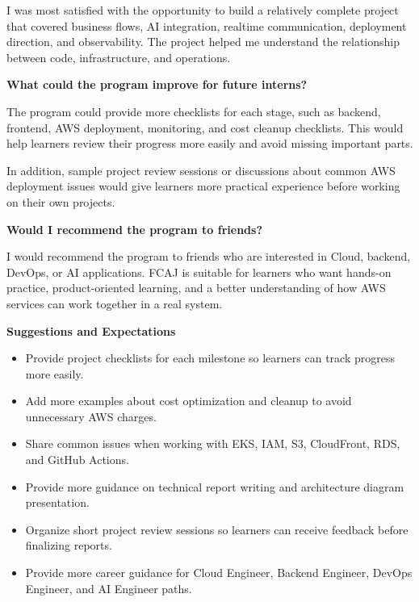 I was most satisfied with the opportunity to build a relatively complete
project that covered business flows, AI integration, realtime
communication, deployment direction, and observability. The project
helped me understand the relationship between code, infrastructure, and
operations.

\vspace{0.5em}\noindent\textbf{What could the program improve for future
interns?}\par

The program could provide more checklists for each stage, such as
backend, frontend, AWS deployment, monitoring, and cost cleanup
checklists. This would help learners review their progress more easily
and avoid missing important parts.

In addition, sample project review sessions or discussions about common
AWS deployment issues would give learners more practical experience
before working on their own projects.

\vspace{0.5em}\noindent\textbf{Would I recommend the program to
friends?}\par

I would recommend the program to friends who are interested in Cloud,
backend, DevOps, or AI applications. FCAJ is suitable for learners who
want hands-on practice, product-oriented learning, and a better
understanding of how AWS services can work together in a real system.

\vspace{0.5em}\noindent\textbf{Suggestions and
Expectations}\par

\begin{itemize}
\tightlist
\item
  Provide project checklists for each milestone so learners can track
  progress more easily.
\item
  Add more examples about cost optimization and cleanup to avoid
  unnecessary AWS charges.
\item
  Share common issues when working with EKS, IAM, S3, CloudFront, RDS,
  and GitHub Actions.
\item
  Provide more guidance on technical report writing and architecture
  diagram presentation.
\item
  Organize short project review sessions so learners can receive
  feedback before finalizing reports.
\item
  Provide more career guidance for Cloud Engineer, Backend Engineer,
  DevOps Engineer, and AI Engineer paths.
\end{itemize}

